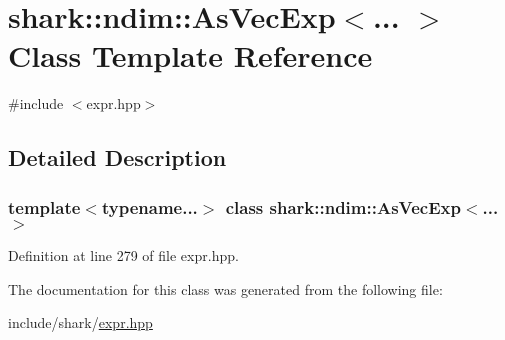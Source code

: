 \hypertarget{classshark_1_1ndim_1_1_as_vec_exp}{}\section{shark\+:\+:ndim\+:\+:As\+Vec\+Exp$<$... $>$ Class Template Reference}
\label{classshark_1_1ndim_1_1_as_vec_exp}


{\ttfamily \#include $<$expr.\+hpp$>$}



\subsection{Detailed Description}
\subsubsection*{template$<$typename...$>$\newline
class shark\+::ndim\+::\+As\+Vec\+Exp$<$... $>$}



Definition at line 279 of file expr.\+hpp.



The documentation for this class was generated from the following file\+:\begin{DoxyCompactItemize}
\item 
include/shark/\hyperlink{expr_8hpp}{expr.\+hpp}\end{DoxyCompactItemize}
